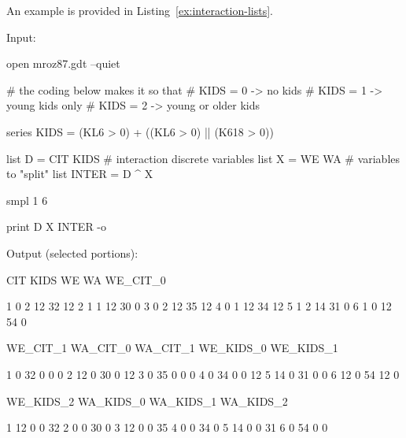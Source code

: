 An example is provided in Listing~\ref{ex:interaction-lists}.

\begin{script}[ht]
Input:
\begin{scode}
open mroz87.gdt --quiet

# the coding below makes it so that
# KIDS = 0 -> no kids
# KIDS = 1 -> young kids only
# KIDS = 2 -> young or older kids

series KIDS = (KL6 > 0) + ((KL6 > 0) || (K618 > 0))

list D = CIT KIDS # interaction discrete variables 
list X = WE WA    # variables to "split"
list INTER = D ^ X

smpl 1 6

print D X INTER -o
\end{scode}

Output (selected portions):
\begin{outbit}
           CIT         KIDS           WE           WA     WE_CIT_0

1            0            2           12           32           12
2            1            1           12           30            0
3            0            2           12           35           12
4            0            1           12           34           12
5            1            2           14           31            0
6            1            0           12           54            0

      WE_CIT_1     WA_CIT_0     WA_CIT_1    WE_KIDS_0    WE_KIDS_1

1            0           32            0            0            0
2           12            0           30            0           12
3            0           35            0            0            0
4            0           34            0            0           12
5           14            0           31            0            0
6           12            0           54           12            0

     WE_KIDS_2    WA_KIDS_0    WA_KIDS_1    WA_KIDS_2

1           12            0            0           32
2            0            0           30            0
3           12            0            0           35
4            0            0           34            0
5           14            0            0           31
6            0           54            0            0

\end{outbit}
\end{script}

